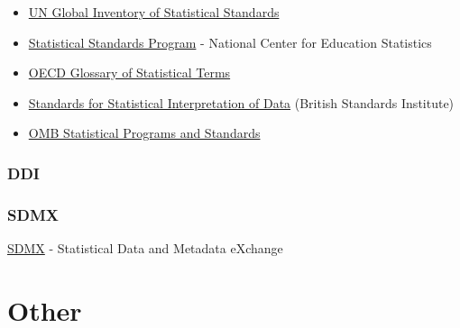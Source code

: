 \documentclass[reqno,12pt]{tufte-book}
\numberwithin{equation}{subsection}
\begin{document}
\begin{itemize}
\item \href{http://unstats.un.org/unsd/iiss/List-of-Statistical-Standards.ashx}{UN
  Global Inventory of Statistical Standards}

\item \href{https://nces.ed.gov/statprog/standards.asp}{Statistical Standards Program} - National Center for Education Statistics

\item \href{https://stats.oecd.org/glossary/index.htm}{OECD Glossary of Statistical Terms}

\item \href{http://shop.bsigroup.com/Browse-By-Subject/Quality--Sampling/Full-list-of-statistical-standards/Statistical-interpretation-of-data/}{Standards for Statistical Interpretation of Data} (British Standards Institute)

\item \href{http://www.whitehouse.gov/omb/inforeg_statpolicy}{OMB Statistical Programs and Standards}

\end{itemize}


\subsection{DDI}
\label{subsect:ddi}

\subsection{SDMX}
\label{subsect:sdmx}

\href{http://sdmx.org/}{SDMX} - Statistical Data and Metadata eXchange















\chapter{Other}
\end{document}
